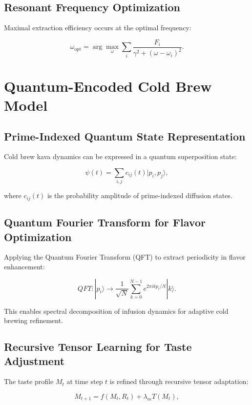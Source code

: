 \documentclass{article}
\theoremstyle{plain}
\theoremstyle{claimstyle}
\begin{document}
\subsection{Resonant Frequency Optimization}
Maximal extraction efficiency occurs at the optimal frequency:

\begin{equation}
    \omega_{\text{opt}} = \arg\max_{\omega} \sum_{i} \frac{F_i}{\gamma^2 + (\omega - \omega_i)^2}.
\end{equation}

\section{Quantum-Encoded Cold Brew Model}
\subsection{Prime-Indexed Quantum State Representation}
Cold brew kava dynamics can be expressed in a quantum superposition state:

\begin{equation}
    \psi(t) = \sum_{i,j} c_{ij}(t) |p_i, p_j \rangle,
\end{equation}

where \( c_{ij}(t) \) is the probability amplitude of prime-indexed diffusion states.

\subsection{Quantum Fourier Transform for Flavor Optimization}
Applying the Quantum Fourier Transform (QFT) to extract periodicity in flavor enhancement:

\begin{equation}
    QFT: | p_i \rangle \rightarrow \frac{1}{\sqrt{N}} \sum_{k=0}^{N-1} e^{2\pi i k p_i / N} | k \rangle.
\end{equation}

This enables spectral decomposition of infusion dynamics for adaptive cold brewing refinement.


\subsection{Recursive Tensor Learning for Taste Adjustment}
The taste profile \( M_t \) at time step \( t \) is refined through recursive tensor adaptation:

\begin{equation}
    M_{t+1} = f(M_t, R_t) + \lambda_m T(M_t),
\end{equation}
\end{document}
